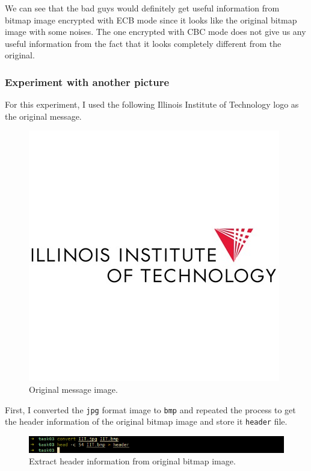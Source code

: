 \documentclass{article}
\begin{document}
We can see that the bad guys would definitely get useful information from
bitmap image encrypted with ECB mode since it looks like the original bitmap
image with some noises. The one encrypted with CBC mode does not give us any
useful information from the fact that it looks completely different from the
original.

\subsubsection{Experiment with another picture}

For this experiment, I used the following Illinois Institute of Technology logo
as the original message.

\begin{figure}[!ht]
    \centering
    \includegraphics[scale=0.68]{IIT.jpg}
    \caption{Original message image.}
\end{figure}

First, I converted the \texttt{jpg} format image to \texttt{bmp} and repeated
the process to get the header information of the original bitmap image and store
it \texttt{header} file.

\begin{figure}[!ht]
    \centering
    \includegraphics[scale=0.68]{task03_1_header.png}
    \caption{Extract header information from original bitmap image.}
\end{figure}
\end{document}
